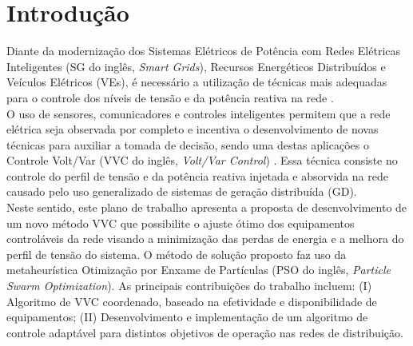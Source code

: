 \documentclass[]{IEEEphot}
\begin{document}
\section{Introdução}
Diante da modernização dos Sistemas Elétricos de Potência com Redes Elétricas Inteligentes (SG do inglês, \textit{Smart Grids}), Recursos Energéticos Distribuídos e Veículos Elétricos (VEs), é necessário a utilização de técnicas mais adequadas para o controle dos níveis de tensão e da potência reativa na rede \cite{Agostinho2019}. \\%
O uso de sensores, comunicadores e controles inteligentes permitem que a rede elétrica seja observada por completo e incentiva o desenvolvimento de novas técnicas para auxiliar a tomada de decisão, sendo uma destas aplicações o Controle Volt/Var (VVC do inglês, \textit{Volt/Var Control}) \cite{Mello2018}. Essa técnica consiste no controle do perfil de tensão e da potência reativa injetada e absorvida na rede causado pelo uso generalizado de sistemas de geração distribuída (GD).\\
Neste sentido, este plano de trabalho apresenta a proposta de desenvolvimento de um novo método VVC que possibilite o ajuste ótimo dos equipamentos controláveis da rede visando a minimização das perdas de energia e a melhora do perfil de tensão do sistema. O método de solução proposto faz uso da metaheurística Otimização por Enxame de Partículas (PSO do inglês, \textit{Particle Swarm Optimization}). As principais contribuições do trabalho incluem: (I) Algoritmo de VVC coordenado, baseado na efetividade e disponibilidade de equipamentos; (II) Desenvolvimento e implementação de um algoritmo de controle adaptável para distintos objetivos de operação nas redes de distribuição. 
 
\end{document}
